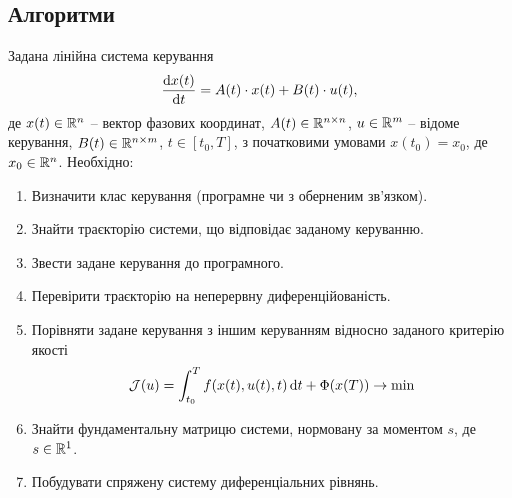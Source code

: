 \subsection{Алгоритми}

\begin{problem*}
    \label{algo-1-1}
	Задана лінійна система керування 
	\begin{equation} 
	    \label{eq:algo-1-1}
	    \frac{\mathop{}\!\mathrm{d} x(t)}{\mathop{}\!\mathrm{d} t} = A (t) \cdot x(t) + B(t) \cdot u(t),
	\end{equation} 
	де $x(t) \in \mathbb{R}^n$ -- вектор фазових координат, $A(t) \in \mathbb{R}^{n\times n}$, $u \in \mathbb{R}^m$ -- відоме керування, $B(t) \in \mathbb{R}^{n \times m}$, $t \in [t_0, T]$, з початковими умовами $x(t_0) = x_0$, де $x_0 \in \mathbb{R}^n$. Необхідно:
	\begin{enumerate}
		\item Визначити клас керування (програмне чи з оберненим зв'язком).
		\item Знайти траєкторію системи, що відповідає заданому керуванню.
		\item Звести задане керування до програмного.
		\item Перевірити траєкторію на неперервну диференційованість.
		\item Порівняти задане керування з іншим керуванням відносно заданого критерію якості 
		\begin{equation}
		    \label{eq:algo-1-2}
		    \mathcal{J}(u) = \int_{t_0}^T f(x(t), u(t), t) \mathop{}\!\mathrm{d} t + \Phi(x(T)) \to \min    
		\end{equation}
		\item Знайти фундаментальну матрицю системи, нормовану за моментом $s$, де $s \in \mathbb{R}^1$.
		\item Побудувати спряжену систему диференціальних рівнянь.
	\end{enumerate}
\end{problem*}

